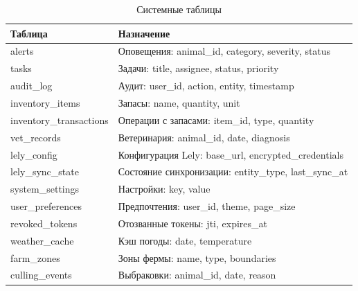 \begin{table}
  \caption{Системные таблицы}
  \begin{tabular}{|l|p{8cm}|}
    \hline
    \textbf{Таблица} & \textbf{Назначение} \\
    \hline
    alerts & Оповещения: animal\_id, category, severity, status \\
    \hline
    tasks & Задачи: title, assignee, status, priority \\
    \hline
    audit\_log & Аудит: user\_id, action, entity, timestamp \\
    \hline
    inventory\_items & Запасы: name, quantity, unit \\
    \hline
    inventory\_transactions & Операции с запасами: item\_id, type, quantity \\
    \hline
    vet\_records & Ветеринария: animal\_id, date, diagnosis \\
    \hline
    lely\_config & Конфигурация Lely: base\_url, encrypted\_credentials \\
    \hline
    lely\_sync\_state & Состояние синхронизации: entity\_type, last\_sync\_at \\
    \hline
    system\_settings & Настройки: key, value \\
    \hline
    user\_preferences & Предпочтения: user\_id, theme, page\_size \\
    \hline
    revoked\_tokens & Отозванные токены: jti, expires\_at \\
    \hline
    weather\_cache & Кэш погоды: date, temperature \\
    \hline
    farm\_zones & Зоны фермы: name, type, boundaries \\
    \hline
    culling\_events & Выбраковки: animal\_id, date, reason \\
    \hline
  \end{tabular}
  \label{dbtables3}
\end{table}
